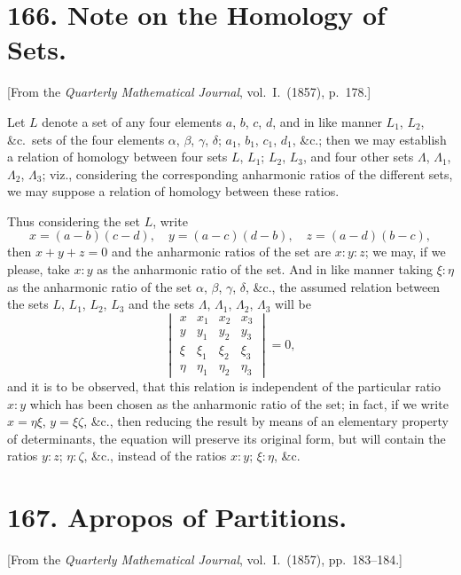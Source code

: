 \documentclass[11pt,a4paper]{book}
\begin{document}
\newpage
\section*{166. Note on the Homology of Sets.}

[From the \textit{Quarterly Mathematical Journal}, vol.~I.~(1857), p.~178.]

Let $L$ denote a set of any four elements $a$, $b$, $c$, $d$, and in like manner $L_1$, $L_2$, \&c.\ sets of the four elements $\alpha$, $\beta$, $\gamma$, $\delta$; $a_1$, $b_1$, $c_1$, $d_1$, \&c.; then we may establish a relation of homology between four sets $L$, $L_1$; $L_2$, $L_3$, and four other sets $\Lambda$, $\Lambda_1$, $\Lambda_2$, $\Lambda_3$; viz., considering the corresponding anharmonic ratios of the different sets, we may suppose a relation of homology between these ratios.

Thus considering the set $L$, write
\[
x = (a-b)(c-d),\quad y = (a-c)(d-b),\quad z = (a-d)(b-c),
\]
then $x+y+z=0$ and the anharmonic ratios of the set are $x:y:z$; we may, if we please, take $x:y$ as the anharmonic ratio of the set. And in like manner taking $\xi:\eta$ as the anharmonic ratio of the set $\alpha$, $\beta$, $\gamma$, $\delta$, \&c., the assumed relation between the sets $L$, $L_1$, $L_2$, $L_3$ and the sets $\Lambda$, $\Lambda_1$, $\Lambda_2$, $\Lambda_3$ will be
\[
\begin{vmatrix}
x & x_1 & x_2 & x_3 \\
y & y_1 & y_2 & y_3 \\
\xi & \xi_1 & \xi_2 & \xi_3 \\
\eta & \eta_1 & \eta_2 & \eta_3
\end{vmatrix} = 0,
\]
and it is to be observed, that this relation is independent of the particular ratio $x:y$ which has been chosen as the anharmonic ratio of the set; in fact, if we write $x=\eta\xi$, $y=\xi\zeta$, \&c., then reducing the result by means of an elementary property of determinants, the equation will preserve its original form, but will contain the ratios $y:z$; $\eta:\zeta$, \&c., instead of the ratios $x:y$; $\xi:\eta$, \&c.


\newpage
\section*{167. Apropos of Partitions.}

[From the \textit{Quarterly Mathematical Journal}, vol.~I.~(1857), pp.~183--184.]
\end{document}
